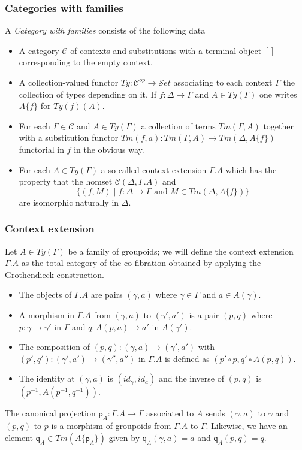 \documentclass[handout,xcolor=dvipsnames]{beamer}
\begin{document}
\begin{frame}
  \frametitle{Categories with families}
\begin{definition}
A \emph{Category with families} consists of the following data
\begin{itemize}
\item A category $\mathcal{C}$ of contexts and substitutions with a terminal
object $[]$ corresponding to the empty context.
\item A collection-valued functor $Ty:\mathcal{C}^{op}\to\mathcal{S}et$ associating
to each context $\Gamma$ the collection of types depending on it. If $f:\Delta\to
\Gamma$ and $A\in Ty(\Gamma)$ one writes $A\{f\}$ for $Ty(f)(A)$.
\item For each $\Gamma\in\mathcal{C}$ and $A\in Ty(\Gamma)$ a collection of terms
$Tm(\Gamma,A)$ together with a substitution functor $Tm(f,a):Tm(\Gamma,A)\to
Tm(\Delta,A\{f\})$ functorial in $f$ in the obvious way.
\item For each $A\in Ty(\Gamma)$ a so-called context-extension $\Gamma.A$ which has
the property that the homset $\mathcal{C}(\Delta,\Gamma.A)$ and
\begin{equation*}
\{(f,M)\mid f:\Delta\to\Gamma\text{ and }M\in Tm(\Delta,A\{f\})\}
\end{equation*}
are isomorphic naturally in $\Delta$.
\end{itemize}
\end{definition}
\end{frame}

\begin{frame}
  \frametitle{Context extension}
\begin{definition}
Let $A\in Ty(\Gamma)$ be a family of groupoids; we will define the context
extension $\Gamma.A$ as the total category of the co-fibration obtained by
applying the Grothendieck construction.
\begin{itemize}
\item The objects of $\Gamma.A$ are pairs $(\gamma,a)$ where $\gamma\in\Gamma$ and
$a\in A(\gamma)$.
\item A morphism in $\Gamma.A$ from $(\gamma,a)$ to $(\gamma',a')$
is a pair $(p,q)$ where $p:\gamma\to\gamma'$ in $\Gamma$ and $q:A(p,a)\to a'$ in
$A(\gamma')$.
\item The composition of $(p,q):(\gamma,a)\to(\gamma',a')$ with
$(p',q'):(\gamma',a')\to(\gamma'',a'')$ in $\Gamma.A$ is defined as
$(p'\circ p,q'\circ A(p,q))$.
\item The identity at $(\gamma,a)$ is $(id_\gamma,id_a)$
and the inverse of $(p,q)$ is $(p^{-1},A(p^{-1},q^{-1}))$.
\end{itemize}
The canonical projection $\mathsf{p}_A:\Gamma.A\to\Gamma$ associated to $A$ sends 
$(\gamma,a)$ to $\gamma$ and $(p,q)$ to $p$ is a 
morphism of groupoids from $\Gamma.A$ to $\Gamma$. Likewise, we have an element
$\mathsf{q}_A\in Tm(A\{\mathsf{p}_A\})$ given by $\mathsf{q}_A(\gamma,a)=a$ and
$\mathsf{q}_A(p,q)=q$.
\end{definition}
\end{frame}
\end{document}
